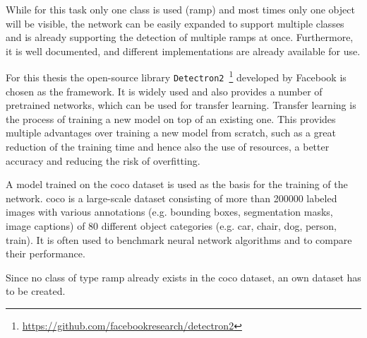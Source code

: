 While for this task only one class is used (ramp) and most times only one object will be visible, the network can be easily expanded to support multiple classes and is already supporting the detection of multiple ramps at once.
Furthermore, it is well documented, and different implementations are already available for use.\par
For this thesis the open-source library \texttt{Detectron2}~\footnote{\url{https://github.com/facebookresearch/detectron2}} \cite{Wu2019} developed by Facebook is chosen as the framework.
It is widely used and also provides a number of pretrained networks, which can be used for transfer learning.
Transfer learning is the process of training a new model on top of an existing one.
This provides multiple advantages over training a new model from scratch, such as a great reduction of the training time and hence also the use of resources, a better accuracy and reducing the risk of overfitting.\par
A model trained on the \gls{coco} dataset \cite{Lin2014} is used as the basis for the training of the network.
\gls{coco} is a large-scale dataset consisting of more than \num{200000} labeled images with various annotations (e.g. bounding boxes, segmentation masks, image captions) of 80 different object categories (e.g. car, chair, dog, person, train).
It is often used to benchmark neural network algorithms and to compare their performance.\par
Since no class of type ramp already exists in the \gls{coco} dataset, an own dataset has to be created.


